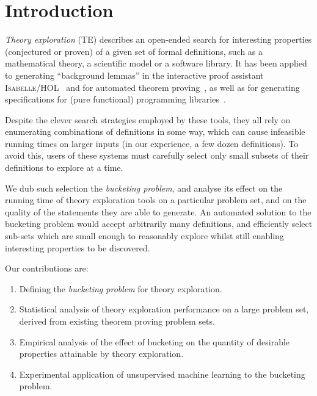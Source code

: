 \section{Introduction}

\emph{Theory exploration} (TE) describes an open-ended search for
interesting properties (conjectured or proven) of a given set of formal
definitions, such as a mathematical theory, a scientific model or a software
library. It has been applied to generating ``background lemmas'' in the
interactive proof assistant
\textsc{Isabelle/HOL}~\cite{johansson2009isacosy,Hipster} and for automated
theorem proving~\cite{claessen2013automating}, as well as for generating
specifications for (pure functional) programming
libraries~\cite{QuickSpec,smallbone2017quick,braquehais2017speculate}.

Despite the clever search strategies employed by these tools, they all rely on
enumerating combinations of definitions in some way, which can cause infeasible
running times on larger inputs (in our experience, a few dozen definitions). To
avoid this, users of these systems must carefully select only small subsets of
their definitions to explore at a time.

We dub such selection the \emph{bucketing problem}, and analyse its effect on
the running time of theory exploration tools on a particular problem set, and on
the quality of the statements they are able to generate. An automated solution
to the bucketing problem would accept arbitrarily many definitions, and
efficiently select sub-sets which are small enough to reasonably explore whilst
still enabling interesting properties to be discovered.

Our contributions are:

\begin{enumerate}
  \item Defining the \emph{bucketing problem} for theory exploration.
  \item Statistical analysis of theory exploration performance on a large
    problem set, derived from existing theorem proving problem sets.
  \item Empirical analysis of the effect of bucketing on the quantity of
    desirable properties attainable by theory exploration.
  \item Experimental application of unsupervised machine learning to the
    bucketing problem.
\end{enumerate}

